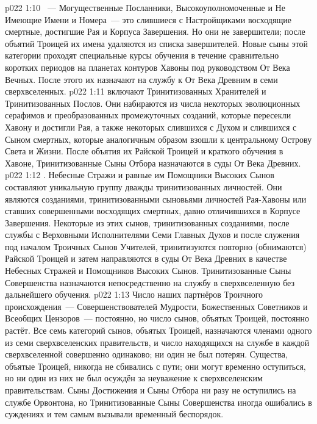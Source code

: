 \vs p022 1:10 \pc {}~--- Могущественные Посланники, Высокоуполномоченные и Не Имеющие Имени и Номера~--- это слившиеся с Настройщиками восходящие смертные, достигшие Рая и Корпуса Завершения. Но они не завершители; после объятий Троицей их имена удаляются из списка завершителей. Новые сыны этой категории проходят специальные курсы обучения в течение сравнительно коротких периодов на планетах контуров Хавоны под руководством От Века Вечных. После этого их назначают на службу к От Века Древним в семи сверхвселенных.
\vs p022 1:11 \pc {} включают Тринитизованных Хранителей и Тринитизованных Послов. Они набираются из числа некоторых эволюционных серафимов и преобразованных промежуточных созданий, которые пересекли Хавону и достигли Рая, а также некоторых слившихся с Духом и слившихся с Сыном смертных, которые аналогичным образом взошли к центральному Острову Света и Жизни. После объятия их Райской Троицей и краткого обучения в Хавоне, Тринитизованные Сыны Отбора назначаются в суды От Века Древних.
\vs p022 1:12 \pc {}. Небесные Стражи и равные им Помощники Высоких Сынов составляют уникальную группу дважды тринитизованных личностей. Они являются созданиями, тринитизованными сыновьями личностей Рая\hyp{}Хавоны или ставших совершенными восходящих смертных, давно отличившихся в Корпусе Завершения. Некоторые из этих сынов, тринитизованных созданиями, после службы с Верховными Исполнителями Семи Главных Духов и после служения под началом Троичных Сынов Учителей, тринитизуются повторно (обнимаются) Райской Троицей и затем направляются в суды От Века Древних в качестве Небесных Стражей и Помощников Высоких Сынов. Тринитизованные Сыны Совершенства назначаются непосредственно на службу в сверхвселенную без дальнейшего обучения.
\vs p022 1:13 \pc Число наших партнёров Троичного происхождения~--- Совершенствователей Мудрости, Божественных Советников и Всеобщих Цензоров~--- постоянно, но число сынов, объятых Троицей, постоянно растёт. Все семь категорий сынов, объятых Троицей, назначаются членами одного из семи сверхвселенских правительств, и число находящихся на службе в каждой сверхвселенной совершенно одинаково; ни один не был потерян. Существа, объятые Троицей, никогда не сбивались с пути; они могут временно оступиться, но ни один из них не был осуждён за неуважение к сверхвселенским правительствам. Сыны Достижения и Сыны Отбора ни разу не оступились на службе Орвонтона, но Тринитизованные Сыны Совершенства иногда ошибались в суждениях и тем самым вызывали временный беспорядок.
